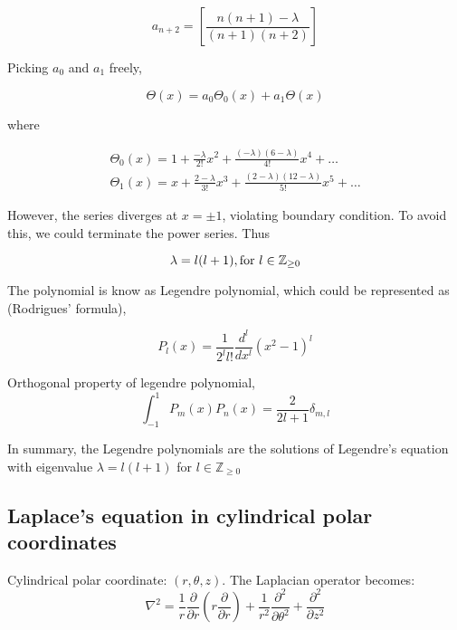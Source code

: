 \documentclass{article}
\theoremstyle{definition}
\begin{document}
\begin{equation}
a_{n+2}=\left[\frac{n(n+1)-\lambda}{(n+1)(n+2)}\right]
\end{equation}

Picking $a_0$ and $a_1$ freely,

\begin{equation}
\Theta(x)=a_0\Theta_0(x)+a_1\Theta(x)
\end{equation}

where

\begin{align}
\Theta_0(x)=1+\frac{-\lambda}{2!}x^2+\frac{(-\lambda)(6-\lambda)}{4!}x^4+ \ldots\\
\Theta_1(x)=x+\frac{2-\lambda}{3!}x^3+\frac{(2-\lambda)(12-\lambda)}{5!}x^5+ \ldots
\end{align}

However, the series diverges at $x=\pm 1$, violating boundary condition. To avoid this, we could terminate the power series. Thus

\begin{equation}
\lambda=l(l+1), \textup{for} \  l\in \mathbb{Z}_{\geq 0}
\end{equation}


The polynomial is know as Legendre polynomial, which could be represented as (Rodrigues' formula),

\begin{equation}
P_l(x)=\frac{1}{2^l l!}\frac{d^l}{dx^l}(x^2-1)^l
\end{equation}



Orthogonal property of legendre polynomial,
\begin{equation}
\int_{-1}^{1}P_m(x)P_n(x)=\frac{2}{2l+1}\delta_{m,l}
\end{equation}


In summary, the Legendre polynomials are the solutions of Legendre's equation with eigenvalue $\lambda=l(l+1)$ for $l\in \mathbb{Z}_{\geq 0}$

\subsection{Laplace's equation in cylindrical polar coordinates}

Cylindrical polar coordinate: $(r,\theta,z)$. The Laplacian operator becomes:
\begin{equation}
\nabla^2=\frac{1}{r}\frac{\partial}{\partial r}\left(r\frac{\partial}{\partial r}\right)+\frac{1}{r^2}\frac{\partial^2}{\partial \theta ^2}+\frac{\partial^2}{\partial z^2}
\end{equation}
\end{document}
